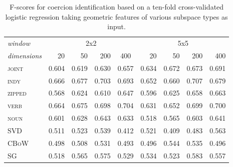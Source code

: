 \begin{table}
\centering
\begin{tabular}{lrrrr|rrrr}
\hline
\emph{window} & \multicolumn{4}{c}{2x2} & \multicolumn{4}{c}{5x5} \\
\emph{dimensions} & 20 & 50 & 200 & \multicolumn{1}{c}{400} & 20 & 50 & 200 & 400 \\
\hline
\textsc{joint} & 0.604 & 0.619 & 0.630 & 0.657 & 0.634 & 0.672 & 0.673 & 0.691 \\
\textsc{indy} & 0.666 & 0.677 & 0.703 & 0.693 & 0.652 & 0.660 & 0.707 & 0.679 \\
\textsc{zipped} & 0.568 & 0.624 & 0.610 & 0.647 & 0.596 & 0.625 & 0.658 & 0.663 \\
\textsc{verb} & 0.664 & 0.675 & 0.698 & 0.704 & 0.631 & 0.652 & 0.699 & 0.700 \\
\textsc{noun} & 0.601 & 0.628 & 0.643 & 0.633 & 0.518 & 0.565 & 0.603 & 0.641 \\
\textsc{SVD} & 0.511 & 0.523 & 0.539 & 0.412 & 0.521 & 0.409 & 0.483 & 0.563 \\
\textsc{CBoW} & 0.498 & 0.508 & 0.531 & 0.493 & 0.496 & 0.544 & 0.535 & 0.496 \\
\textsc{SG} & 0.518 & 0.565 & 0.575 & 0.529 & 0.534 & 0.523 & 0.583 & 0.557 \\
\hline
\end{tabular}
\caption[Context Sensitive and Static Model F-Scores for Coercion Classification]{F-scores for coercion identification based on a ten-fold cross-validated logistic regression taking geometric features of various subspace types as input.}
\label{tab:coercion}
\end{table}

